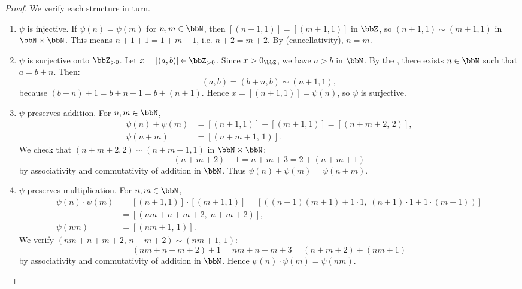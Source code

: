 \begin{proof}
    We verify each structure in turn.

    \begin{enumerate}
        \item $\psi$ is injective. If $\psi(n) = \psi(m)$ for $n,m \in \bbN$, then $[(n+1,1)] = [(m+1,1)]$ in $\bbZ$, so $(n+1,1) \sim (m+1,1)$ in $\bbN \times \bbN$. This means $n+1+1 = 1 + m+1$, i.e. $n+2 = m+2$. By  (cancellativity), $n = m$.

        \item $\psi$ is surjective onto $\bbZ_{> 0}$. Let $x = [(a,b)] \in \bbZ_{> 0}$. Since $x > 0_\bbZ$, we have $a > b$ in $\bbN$. By the , there exists $n \in \bbN$ such that $a = b + n$. Then:
        $$(a,b) = (b+n, b) \sim (n+1, 1),$$
        because $(b+n) + 1 = b + n + 1 = b + (n+1)$. Hence $x = [(n+1,1)] = \psi(n)$, so $\psi$ is surjective.

        \item $\psi$ preserves addition. For $n,m \in \bbN$,
        \begin{align*}
        \psi(n) + \psi(m) &= [(n+1, 1)] + [(m+1, 1)] = [(n+m+2,\, 2)], \\
        \psi(n+m) &= [(n+m+1,\, 1)].
        \end{align*}
        We check that $(n+m+2,2) \sim (n+m+1,1)$ in $\bbN \times \bbN$:
        $$(n+m+2) + 1 = n+m+3 = 2 + (n+m+1)$$
        by associativity and commutativity of addition in $\bbN$. Thus $\psi(n) + \psi(m) = \psi(n+m)$.

        \item $\psi$ preserves multiplication. For $n,m \in \bbN$,
        \begin{align*}
        \psi(n) \cdot \psi(m) &= [(n+1,1)] \cdot [(m+1,1)] = [((n+1)(m+1)+1\cdot 1,\; (n+1)\cdot 1 + 1\cdot(m+1))] \\
        &= [(nm+n+m+2,\; n+m+2)], \\
        \psi(nm) &= [(nm+1,\, 1)].
        \end{align*}
        We verify $(nm+n+m+2,\, n+m+2) \sim (nm+1,\, 1)$:
        $$(nm+n+m+2) + 1 = nm+n+m+3 = (n+m+2) + (nm+1)$$
        by associativity and commutativity of addition in $\bbN$. Hence $\psi(n) \cdot \psi(m) = \psi(nm)$.


\end{enumerate}
\end{proof}
